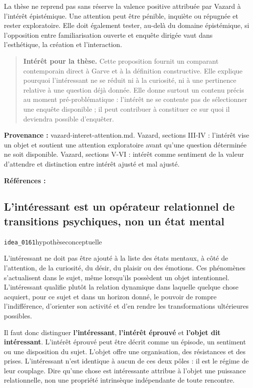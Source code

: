 \documentclass[10pt,a4paper]{article}
\begin{document}
La thèse ne reprend pas sans réserve la valence positive attribuée par Vazard à l'intérêt épistémique. Une attention peut être pénible, inquiète ou répugnée et rester exploratoire. Elle doit également tester, au-delà du domaine épistémique, si l'opposition entre familiarisation ouverte et enquête dirigée vaut dans l'esthétique, la création et l'interaction.

\begin{quote}
\textbf{Intérêt pour la thèse.} Cette proposition fournit un comparant contemporain direct à Garve et à la définition constructive. Elle explique pourquoi l'intéressant ne se réduit ni à la curiosité, ni à une pertinence relative à une question déjà donnée. Elle donne surtout un contenu précis au moment pré-problématique : l'intérêt ne se contente pas de sélectionner une enquête disponible ; il peut contribuer à constituer ce sur quoi il deviendra possible d'enquêter.
\end{quote}
{\footnotesize\color{metadata}\textbf{Provenance :} vazard-interet-attention.md. Vazard, sections III-IV : l'intérêt vise un objet et soutient une attention exploratoire avant qu'une question déterminée ne soit disponible. Vazard, sections V-VI : intérêt comme sentiment de la valeur d'attendre et distinction entre intérêt ajusté et mal ajusté.\par}
{\footnotesize\color{metadata}\textbf{Références :} \parencite{vazard2026inquiry}\par}

\subsection{L'intéressant est un opérateur relationnel de transitions psychiques, non un état mental}
{\small\color{metadata} \texttt{idea\_0161}\quad\textbullet\quad hypothèse\quad\textbullet\quad conceptuelle\par}

L'intéressant ne doit pas être ajouté à la liste des états mentaux, à côté de l'attention, de la curiosité, du désir, du plaisir ou des émotions. Ces phénomènes s'actualisent dans le sujet, même lorsqu'ils possèdent un objet intentionnel. L'intéressant qualifie plutôt la relation dynamique dans laquelle quelque chose acquiert, pour ce sujet et dans un horizon donné, le pouvoir de rompre l'indifférence, d'orienter son activité et d'en rendre les transformations ultérieures possibles.

Il faut donc distinguer \textbf{l'intéressant}, \textbf{l'intérêt éprouvé} et \textbf{l'objet dit intéressant}. L'intérêt éprouvé peut être décrit comme un épisode, un sentiment ou une disposition du sujet. L'objet offre une organisation, des résistances et des prises. L'intéressant n'est identique à aucun de ces deux pôles : il est le régime de leur couplage. Dire qu'une chose est intéressante attribue à l'objet une puissance relationnelle, non une propriété intrinsèque indépendante de toute rencontre.
\end{document}
